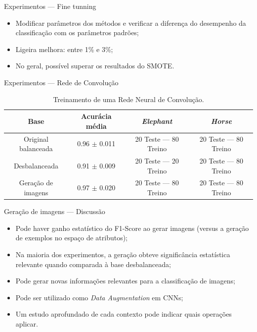 \documentclass[10pt]{beamer}
\begin{document}
\begin{frame}{Experimentos --- Fine tunning}
  \setlength\leftmargini{1em}
  \begin{itemize}
    \item Modificar parâmetros dos métodos e verificar a diferença do desempenho da classificação com os parâmetros padrões;
    \item Ligeira melhora: entre 1\% e 3\%;
    \item No geral, possível superar os resultados do SMOTE.
  \end{itemize}
\end{frame}
\begin{frame}{Experimentos --- Rede de Convolução}
  \setlength\leftmargini{1em}
  \begin{table}
    \footnotesize{
    \caption{Treinamento de uma Rede Neural de Convolução.}
    \begin{tabular}{c|c|c|c}
      Base                    &  Acurácia média & \textit{Elephant} &  \textit{Horse}\\ \hline
      Original balanceada     &  0.96 $\pm$ 0.011 & 20 Teste --- 80 Treino & 20 Teste --- 80 Treino\\
      Desbalanceada           &  0.91 $\pm$ 0.009 & 20 Teste --- 20 Treino & 20 Teste --- 80 Treino\\
      Geração de imagens      &  0.97 $\pm$ 0.020 & 20 Teste --- 80 Treino & 20 Teste --- 80 Treino\\
    \end{tabular}
    }
  \end{table}
\end{frame}
\begin{frame}{Geração de imagens --- Discussão}
  \setlength\leftmargini{1em}
  \begin{itemize}
    \item Pode haver ganho estatístico do F1-Score ao gerar imagens (versus a geração de exemplos no espaço de atributos);
    \item Na maioria dos experimentos, a geração obteve significância estatística relevante quando comparada à base desbalanceada;
    \item Pode gerar novas informações relevantes para a classificação de imagens;
    \item Pode ser utilizado como \textit{Data Augmentation} em CNNs;
    \item Um estudo aprofundado de cada contexto pode indicar quais operações aplicar.
  \end{itemize}
\end{frame}
\end{document}
